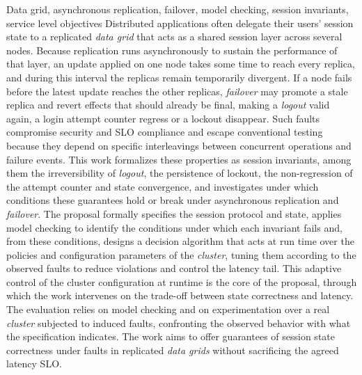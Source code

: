 \documentclass[tcc,baec]{unipampa}
\begin{document}
\begin{englishabstract}{Data grid, asynchronous replication, failover, model checking, session invariants, service level objectives}
Distributed applications often delegate their users' session state to a replicated \emph{data grid} that acts as a shared session layer across several nodes. Because replication runs asynchronously to sustain the performance of that layer, an update applied on one node takes some time to reach every replica, and during this interval the replicas remain temporarily divergent. If a node fails before the latest update reaches the other replicas, \emph{failover} may promote a stale replica and revert effects that should already be final, making a \emph{logout} valid again, a login attempt counter regress or a lockout disappear. Such faults compromise security and SLO compliance and escape conventional testing because they depend on specific interleavings between concurrent operations and failure events. This work formalizes these properties as session invariants, among them the irreversibility of \emph{logout}, the persistence of lockout, the non-regression of the attempt counter and state convergence, and investigates under which conditions these guarantees hold or break under asynchronous replication and \emph{failover}. The proposal formally specifies the session protocol and state, applies model checking to identify the conditions under which each invariant fails and, from these conditions, designs a decision algorithm that acts at run time over the policies and configuration parameters of the \emph{cluster}, tuning them according to the observed faults to reduce violations and control the latency tail. This adaptive control of the cluster configuration at runtime is the core of the proposal, through which the work intervenes on the trade-off between state correctness and latency. The evaluation relies on model checking and on experimentation over a real \emph{cluster} subjected to induced faults, confronting the observed behavior with what the specification indicates. The work aims to offer guarantees of session state correctness under faults in replicated \emph{data grids} without sacrificing the agreed latency SLO.
\end{englishabstract}

\listoffigures
\listoftables
\end{document}
